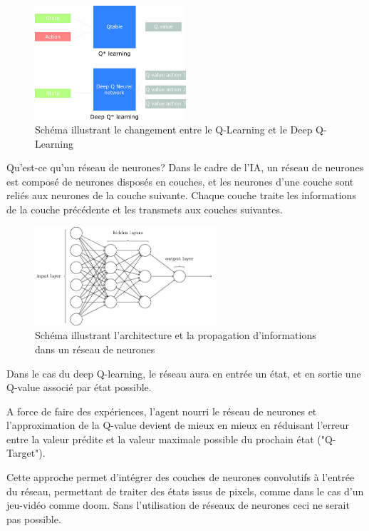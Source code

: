 \documentclass[a4paper,10pt,openany,oneside]{report}
\begin{document}
\begin{figure}[H]
	\centering
	\includegraphics[width=0.5\textwidth]{img/qtable-dqn.png}
	\caption{Schéma illustrant le changement entre le Q-Learning et le Deep Q-Learning \cite[]{freecodecamp}}
\end{figure}

Qu'est-ce qu'un réseau de neurones? Dans le cadre de l'IA, un réseau de neurones est composé de neurones disposés en couches, et les neurones d'une couche sont reliés aux neurones de la couche suivante. Chaque couche traite les informations de la couche précédente et les transmets aux couches suivantes.
\begin{figure}[H]
	\centering
	\includegraphics[width=0.6\textwidth]{img/neuralNetwork.png}
	\caption{Schéma illustrant l'architecture et la propagation d'informations dans un réseau de neurones \cite[]{neuralnetworksanddeeplearning}}
\end{figure}
Dans le cas du deep Q-learning, le réseau aura en entrée un état, et en sortie une Q-value associé par état possible.

A force de faire des expériences, l'agent nourri le réseau de neurones et l'approximation de la Q-value devient de mieux en mieux en réduisant l'erreur entre la valeur prédite et la valeur maximale possible du prochain état ("Q-Target").

Cette approche permet d'intégrer des couches de neurones convolutifs à l'entrée du réseau, permettant de traiter des états issus de pixels, comme dans le cas d'un jeu-vidéo comme doom. Sans l'utilisation de réseaux de neurones ceci ne serait pas possible.
\end{document}
